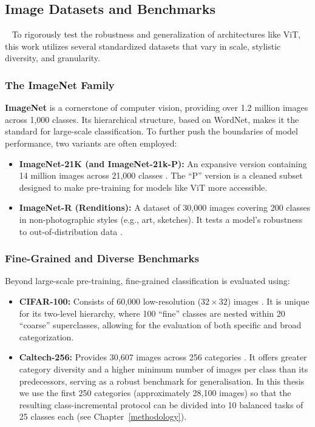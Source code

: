 \subsection{Image Datasets and Benchmarks} 
To rigorously test the robustness and generalization of architectures like ViT, this work utilizes several standardized datasets that vary in scale, stylistic diversity, and granularity.

\subsubsection{The ImageNet Family}
\textbf{ImageNet} \cite{imagenet} is a cornerstone of computer vision, providing over 1.2 million images across 1,000 classes. Its hierarchical structure, based on WordNet, makes it the standard for large-scale classification. To further push the boundaries of model performance, two variants are often employed:
\begin{itemize}
	\item \textbf{ImageNet-21K (and ImageNet-21k-P):} An expansive version containing 14 million images across 21,000 classes \cite{imagenet21k}. The ``P'' version is a cleaned subset designed to make pre-training for models like ViT more accessible.
	\item \textbf{ImageNet-R (Renditions):} A dataset of 30,000 images covering 200 classes in non-photographic styles (e.g., art, sketches). It tests a model's robustness to out-of-distribution data \cite{imagenetR}.
\end{itemize}

\subsubsection{Fine-Grained and Diverse Benchmarks}
Beyond large-scale pre-training, fine-grained classification is evaluated using:

\begin{itemize}
	\item \textbf{CIFAR-100:} Consists of 60,000 low-resolution ($32\times32$) images \cite{cifar100}. It is unique for its two-level hierarchy, where 100 ``fine'' classes are nested within 20 ``coarse'' superclasses, allowing for the evaluation of both specific and broad categorization.
	\item \textbf{Caltech-256:} Provides 30,607 images across 256 categories \cite{caltech256}. It offers greater category diversity and a higher minimum number of images per class than its predecessors, serving as a robust benchmark for generalisation. In this thesis we use the first 250 categories (approximately 28,100 images) so that the resulting class-incremental protocol can be divided into 10 balanced tasks of 25 classes each (see Chapter~\ref{methodology}).
\end{itemize}


